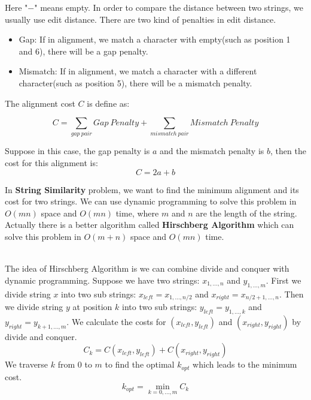 \documentclass{article}
\begin{document}
Here "$-$" means empty. In order to compare the distance between two strings, we usually use edit distance. There are two kind of penalties in edit distance.
\begin{itemize}
    \item Gap: If in alignment, we match a character with empty(such as position 1 and 6), there will be a gap penalty.
    
    \item Mismatch: If in alignment, we match a character with a different character(such as position 5), there will be a mismatch penalty.
\end{itemize} 

The alignment cost $C$ is define as:

\begin{equation*}
    C = \sum_{gap\ pair}Gap\ Penalty + \sum_{mismatch\ pair}Mismatch\ Penalty
\end{equation*}

Suppose in this case, the gap penalty is $a$ and the mismatch penalty is $b$, then the cost for this alignment is:
\begin{equation*}
    C = 2a+b
\end{equation*}

In \textbf{String Similarity} problem, we want to find the minimum alignment and its cost for two strings. We can use dynamic programming to solve this problem in $O(mn)$ space and $O(mn)$ time, where $m$ and $n$ are the length of the string. Actually there is a better algorithm called \textbf{Hirschberg Algorithm} which can solve this problem in $O(m+n)$ space and $O(mn)$ time.

~\\
The idea of Hirschberg Algorithm is we can combine divide and conquer with dynamic programming. Suppose we have two strings: $x_{1,...,n}$ and $y_{1,...,m}$. First we divide string $x$ into two sub strings: $x_{left} = x_{1,...,n/2}$ and $x_{right} = x_{n/2+1,...,n}$. Then we divide string $y$ at position $k$ into two sub strings: $y_{left} = y_{1,...,k}$ and $y_{right} = y_{k+1,...,m}$. We calculate the costs for $(x_{left}, y_{left})$ and $(x_{right}, y_{right})$ by divide and conquer. 
\begin{equation*}
    C_k=C(x_{left}, y_{left}) + C(x_{right}, y_{right})
\end{equation*}
We traverse $k$ from $0$ to $m$ to find the optimal $k_{opt}$ which leads to the minimum cost.
\begin{equation*}
    k_{opt} = \min_{k=0,...,m}C_k
\end{equation*}
\end{document}
